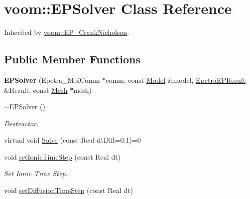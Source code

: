 \hypertarget{classvoom_1_1_e_p_solver}{
\section{voom::EPSolver Class Reference}
\label{classvoom_1_1_e_p_solver}
}


Inherited by \hyperlink{classvoom_1_1_e_p___crank_nicholson}{voom::EP\_\-CrankNicholson}.\subsection*{Public Member Functions}
\begin{DoxyCompactItemize}
\item 
\hypertarget{classvoom_1_1_e_p_solver_a58d24432f8e5f362a07881b819e7725e}{
{\bfseries EPSolver} (Epetra\_\-MpiComm $\ast$comm, const \hyperlink{classvoom_1_1_model}{Model} \&model, \hyperlink{structvoom_1_1_epetra_e_p_result}{EpetraEPResult} \&Result, const \hyperlink{classvoom_1_1_mesh}{Mesh} $\ast$mesh)}
\label{classvoom_1_1_e_p_solver_a58d24432f8e5f362a07881b819e7725e}

\item 
\hypertarget{classvoom_1_1_e_p_solver_abdafae515c8af92bab73ab52568bcb83}{
\hyperlink{classvoom_1_1_e_p_solver_abdafae515c8af92bab73ab52568bcb83}{$\sim$EPSolver} ()}
\label{classvoom_1_1_e_p_solver_abdafae515c8af92bab73ab52568bcb83}

\begin{DoxyCompactList}\small\item\em Destructor. \item\end{DoxyCompactList}\item 
virtual void \hyperlink{classvoom_1_1_e_p_solver_a4eedcdb113d7c15df7b23dd69dc46e0e}{Solve} (const Real dtDiff=0.1)=0
\item 
\hypertarget{classvoom_1_1_e_p_solver_afdf1821369f2a687e1291bd31e7ef194}{
void \hyperlink{classvoom_1_1_e_p_solver_afdf1821369f2a687e1291bd31e7ef194}{setIonicTimeStep} (const Real dt)}
\label{classvoom_1_1_e_p_solver_afdf1821369f2a687e1291bd31e7ef194}

\begin{DoxyCompactList}\small\item\em Set Ionic Time Step. \item\end{DoxyCompactList}\item 
\hypertarget{classvoom_1_1_e_p_solver_a06d7b38460f9c3b1e445f3c0db6d8b9c}{
void \hyperlink{classvoom_1_1_e_p_solver_a06d7b38460f9c3b1e445f3c0db6d8b9c}{setDiffusionTimeStep} (const Real dt)}
\label{classvoom_1_1_e_p_solver_a06d7b38460f9c3b1e445f3c0db6d8b9c}


\end{DoxyCompactItemize}
